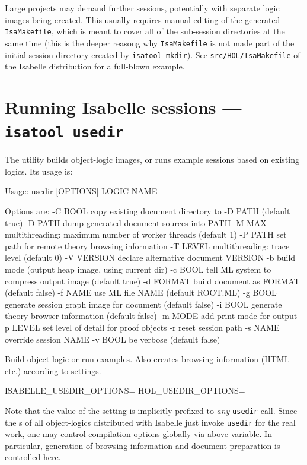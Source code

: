 \medskip Large projects may demand further sessions, potentially with separate
logic images being created.  This usually requires manual editing of the
generated \texttt{IsaMakefile}, which is meant to cover all of the sub-session
directories at the same time (this is the deeper reasong why
\texttt{IsaMakefile} is not made part of the initial session directory created
by \texttt{isatool mkdir}).  See \texttt{src/HOL/IsaMakefile} of the Isabelle
distribution for a full-blown example.


\section{Running Isabelle sessions --- \texttt{isatool usedir}} \label{sec:tool-usedir}

The  utility builds object-logic images, or runs example
sessions based on existing logics. Its usage is:
\begin{ttbox}

Usage: usedir [OPTIONS] LOGIC NAME

  Options are:
    -C BOOL      copy existing document directory to -D PATH (default true)
    -D PATH      dump generated document sources into PATH
    -M MAX       multithreading: maximum number of worker threads (default 1)
    -P PATH      set path for remote theory browsing information
    -T LEVEL     multithreading: trace level (default 0)
    -V VERSION   declare alternative document VERSION
    -b           build mode (output heap image, using current dir)
    -c BOOL      tell ML system to compress output image (default true)
    -d FORMAT    build document as FORMAT (default false)
    -f NAME      use ML file NAME (default ROOT.ML)
    -g BOOL      generate session graph image for document (default false)
    -i BOOL      generate theory browser information (default false)
    -m MODE      add print mode for output
    -p LEVEL     set level of detail for proof objects
    -r           reset session path
    -s NAME      override session NAME
    -v BOOL      be verbose (default false)

  Build object-logic or run examples. Also creates browsing
  information (HTML etc.) according to settings.

  ISABELLE_USEDIR_OPTIONS=
  HOL_USEDIR_OPTIONS=
\end{ttbox}

Note that the value of the  setting is
implicitly prefixed to \emph{any} \texttt{usedir} call. Since the
s of all object-logics distributed with Isabelle just
invoke \texttt{usedir} for the real work, one may control compilation options
globally via above variable. In particular, generation of 
browsing information and document preparation is controlled here.

